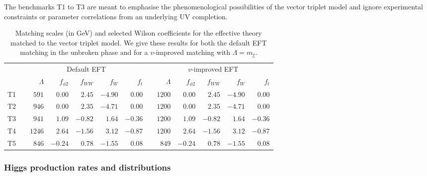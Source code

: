 The benchmarks T1 to T3 are meant to emphasise the phenomenological
possibilities of the vector triplet model and ignore experimental
constraints or parameter correlations from an underlying UV
completion. 

\begin{table}
  \begin{tabular}{c c rrrrr c rrrrr}
    \toprule
    \multirow{2}{*}{} && \multicolumn{5}{c}{Default EFT}
    && \multicolumn{5}{c}{$v$-improved EFT} \\
    \cmidrule{3-7} \cmidrule{9-13}
    && $\Lambda$ & $f_{\phi 2}$ & $f_{WW}$ & $f_W$ & $f_{t}$
    && $\Lambda$ & $f_{\phi 2}$ & $f_{WW}$ & $f_W$ & $f_{t}$\\
    \midrule
    T1 && $591$ & $0.00$ & $2.45$ & $-4.90$ & $0.00$ 
        && $1200$ & $0.00$ & $2.45$ & $-4.90$ & $0.00$ \\
    T2 && $946$ & $0.00$ & $2.35$ & $-4.71$ & $0.00$
         && $1200$ & $0.00$ & $2.35$ & $-4.71$ & $0.00$ \\
    T3 && $941$ & $1.09$ & $-0.82$ & $1.64$ & $-0.36$ 
         && $1200$ & $1.09$ & $-0.82$ & $1.64$ & $-0.36$  \\
    T4 && $1246$ & $2.64$ & $-1.56$ & $3.12$ & $-0.87$
         && $1200$ & $2.64$ & $-1.56$ & $3.12$ & $-0.87$ \\
    T5 && $846$ & $-0.24$ & $0.78$ & $-1.55$ & $0.08$ 
         && $849$ & $-0.24$ & $0.78$ & $-1.55$ & $0.08$ \\
    \bottomrule
    \end{tabular}
    \caption[EFT description for the vector triplet benchmarks]{Matching
      scales (in GeV) and selected Wilson coefficients for the effective
      theory matched to the vector triplet model. We give these results 
      for both the default EFT matching in the unbroken phase and for a
      $v$-improved matching with $\Lambda = m_{\xi}$.}
  \label{tbl:validity_vector_triplet_eft}
\end{table}



\subsubsection{Higgs production rates and distributions}

